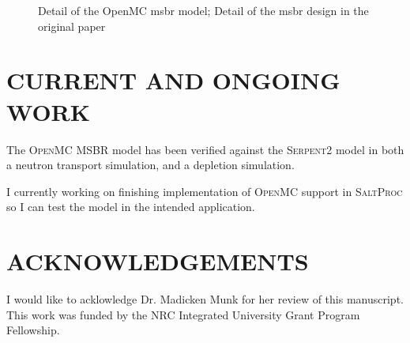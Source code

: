\documentclass[letterpaper]{mc2023}
\newcommand{\SaltProc}{\textsc{SaltProc}\xspace}
\newcommand{\OpenMC}{\textsc{OpenMC}\xspace}
\newcommand{\SerpentTWO}{\textsc{Serpent2}\xspace}
\begin{document}
\begin{figure}[htpb]
    \centering
    \caption[\Gls{msbr} model comparison]{ Detail
    of the OpenMC \Gls{msbr} model;  Detail of
    the \Gls{msbr} design in the original paper}
\end{figure}


\section{CURRENT AND ONGOING WORK}

The \OpenMC MSBR model has been verified against the \SerpentTWO model in both
a neutron transport simulation, and a depletion simulation.

I currently working on finishing implementation of \OpenMC support in \SaltProc
so I can test the model in the intended application.

%

\section*{ACKNOWLEDGEMENTS}
I would like to acklowledge Dr. Madicken Munk for her review of this manuscript.
This work was funded by the NRC Integrated University Grant Program Fellowship.
\end{document}
